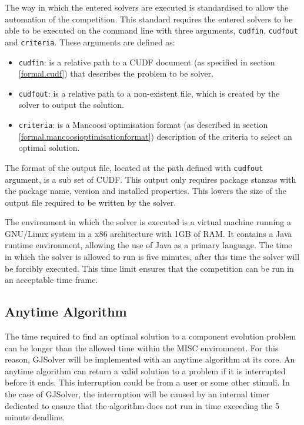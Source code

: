 The way in which the entered solvers are executed is standardised to allow the automation of the competition.
This standard requires the entered solvers to be able to be executed on the command line with three arguments, \verb+cudfin+, \verb+cudfout+ and \verb+criteria+.
These arguments are defined as:
\begin{itemize}
  \item \verb+cudfin+: is a relative path to a CUDF document (as specified in section \ref{formal.cudf}) that describes the problem to be solver.
  \item \verb+cudfout+: is a relative path to a non-existent file, which is created by the solver to output the solution.
  \item \verb+criteria+: is a Mancoosi optimisation format (as described in section \ref{formal.mancoosioptimisationformat}) description of the criteria to select an optimal solution. 
\end{itemize}
The format of the output file, located at the path defined with \verb+cudfout+ argument, is a sub set of CUDF.
This output only requires package stanzas with the package name, version and installed properties.
This lowers the size of the output file required to be written by the solver.

The environment in which the solver is executed is a virtual machine running a GNU/Linux system in a x86 architecture with 1GB of RAM.
It contains a Java runtime environment, allowing the use of Java as a primary language.
The time in which the solver is allowed to run is five minutes, after this time the solver will be forcibly executed.
This time limit ensures that the competition can be run in an acceptable time frame.

\subsection{Anytime Algorithm}
The time required to find an optimal solution to a component evolution problem can be longer than the allowed time within the MISC environment.
For this reason, GJSolver will be implemented with an anytime algorithm at its core.
An anytime algorithm can return a valid solution to a problem if it is interrupted before it ends.
This interruption could be from a user or some other stimuli.
In the case of GJSolver, the interruption will be caused by an internal timer dedicated to ensure that the algorithm does not run in time exceeding the 5 minute deadline.

